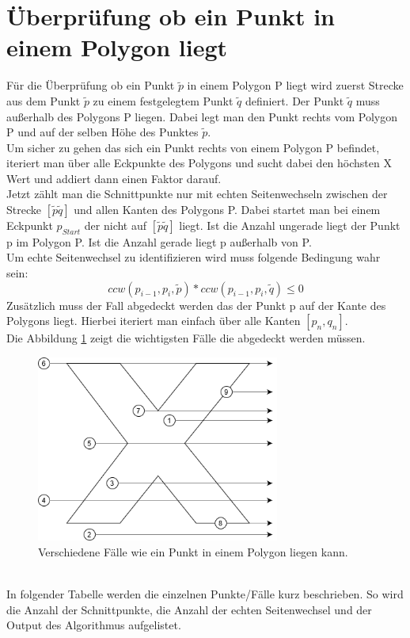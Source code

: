 \documentclass[conference]{IEEEtran}
\begin{document}
	\section{Überprüfung ob ein Punkt in einem Polygon liegt}
	Für die Überprüfung ob ein Punkt $\tilde{p}$ in einem Polygon P liegt wird zuerst Strecke aus dem Punkt $\tilde{p}$ zu einem festgelegtem Punkt $\tilde{q}$ definiert. Der Punkt $\tilde{q}$ muss außerhalb des Polygons P liegen. Dabei legt man den Punkt rechts vom Polygon P und auf der selben Höhe des Punktes $\tilde{p}$.\\
	Um sicher zu gehen das sich ein Punkt rechts von einem Polygon P befindet, iteriert man über alle Eckpunkte des Polygons und sucht dabei den höchsten X Wert und addiert dann einen Faktor darauf.\\
	Jetzt zählt man die Schnittpunkte nur mit echten Seitenwechseln zwischen der Strecke $[\tilde{p}\tilde{q}]$ und allen Kanten des Polygons P. Dabei startet man bei einem Eckpunkt $p_{Start}$ der nicht auf $[\tilde{p}\tilde{q}]$ liegt. Ist die Anzahl ungerade liegt der Punkt p im Polygon P. Ist die Anzahl gerade liegt p außerhalb von P.\\
	Um echte Seitenwechsel zu identifizieren wird muss folgende Bedingung wahr sein:
	\[ ccw(p_{i-1} , p_i, \tilde{p}) * ccw(p_{i-1} , p_i, \tilde{q}) \leq 0 \]
	Zusätzlich muss der Fall abgedeckt werden das der Punkt p auf der Kante des Polygons liegt. Hierbei iteriert man einfach über alle Kanten $[p_n,q_n]$. \\
	Die Abbildung \ref{PointInPoly} zeigt die wichtigsten Fälle die abgedeckt werden müssen.
	\begin{figure}[h]
		\begin{center}
			\includegraphics[width=8cm]{PointInPolygon.png}
			\caption{Verschiedene Fälle wie ein Punkt in einem Polygon liegen kann.}
			\label{PointInPoly}
		\end{center}
	\end{figure}\\
	In folgender Tabelle werden die einzelnen Punkte/Fälle kurz beschrieben. So wird die Anzahl der Schnittpunkte, die Anzahl der echten Seitenwechsel und der Output des Algorithmus aufgelistet.\\
	
\end{document}
